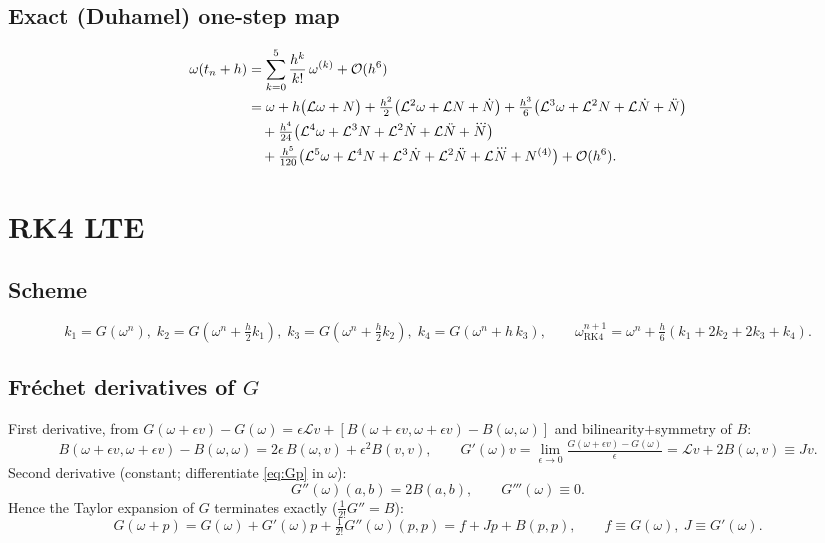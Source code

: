 \documentclass[11pt]{article}
\newcommand{\Lop}{\mathcal{L}}
\newcommand{\Ndot}{\dot{N}}
\newcommand{\Nddot}{\ddot{N}}
\newcommand{\Ndddot}{\dddot{N}}
\newcommand{\bO}{\mathcal{O}}
\begin{document}
\subsection{Exact (Duhamel) one-step map}

\begin{align}
  \omega(t_n+h) &= \sum_{k=0}^{5}\frac{h^k}{k!}\,\omega^{(k)} + \bO(h^6) \notag\\
  &= \omega + h\bigl(\Lop\omega+N\bigr)
   +\tfrac{h^2}{2}\bigl(\Lop^2\omega+\Lop N+\Ndot\bigr)
   +\tfrac{h^3}{6}\bigl(\Lop^3\omega+\Lop^2 N+\Lop\Ndot+\Nddot\bigr)\notag\\
  &\quad+\tfrac{h^4}{24}\bigl(\Lop^4\omega+\Lop^3 N+\Lop^2\Ndot+\Lop\Nddot+\Ndddot\bigr)\notag\\
  &\quad+\tfrac{h^5}{120}\bigl(\Lop^5\omega+\Lop^4 N+\Lop^3\Ndot+\Lop^2\Nddot+\Lop\Ndddot+N^{(4)}\bigr)
   +\bO(h^6). \label{eq:exact-expanded}
\end{align}

\section{RK4 LTE}

\subsection{Scheme}
\begin{equation}
  k_1=G(\omega^n),\;
  k_2=G(\omega^n+\tfrac{h}{2}k_1),\;
  k_3=G(\omega^n+\tfrac{h}{2}k_2),\;
  k_4=G(\omega^n+h\,k_3),\qquad
  \omega^{n+1}_{\mathrm{RK4}} = \omega^n + \tfrac{h}{6}(k_1+2k_2+2k_3+k_4).
  \label{eq:rk4}
\end{equation}

\subsection{Fr\'echet derivatives of $G$}
First derivative, from $G(\omega+\epsilon v)-G(\omega)=\epsilon\Lop v+[B(\omega+\epsilon v,\omega+\epsilon v)-B(\omega,\omega)]$
and bilinearity$+$symmetry of $B$:
\begin{equation}
  B(\omega+\epsilon v,\omega+\epsilon v)-B(\omega,\omega)
   = 2\epsilon\,B(\omega,v)+\epsilon^2 B(v,v),
  \qquad
  G'(\omega)v=\lim_{\epsilon\to0}\tfrac{G(\omega+\epsilon v)-G(\omega)}{\epsilon}
   = \Lop v+2B(\omega,v)\equiv Jv.
  \label{eq:Gp}
\end{equation}
Second derivative (constant; differentiate \eqref{eq:Gp} in $\omega$):
\begin{equation}
  G''(\omega)(a,b)=2B(a,b),\qquad G'''(\omega)\equiv0.
  \label{eq:Gpp}
\end{equation}
Hence the Taylor expansion of $G$ terminates exactly ($\tfrac{1}{2!}G''=B$):
\begin{equation}
  G(\omega+p)=G(\omega)+G'(\omega)p+\tfrac{1}{2!}G''(\omega)(p,p)
   = f+Jp+B(p,p),\qquad f\equiv G(\omega),\ J\equiv G'(\omega).
  \label{eq:Gexact}
\end{equation}
\end{document}
